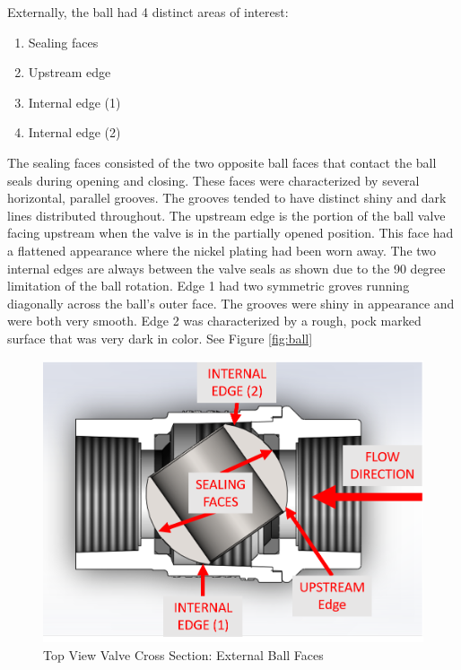\documentclass[]{article}
\begin{document}
Externally, the ball had 4 distinct areas of interest:
\begin{enumerate}
	\item Sealing faces
	\item Upstream edge
	\item Internal edge (1)
	\item Internal edge (2)
	\end{enumerate} 
The sealing faces consisted of the two opposite ball faces that contact the ball seals during opening and closing. These faces were characterized by several horizontal, parallel grooves. The grooves tended to have distinct shiny and dark lines distributed throughout. The upstream edge is the portion of the ball valve facing upstream when the valve is in the partially opened position. This face had a flattened appearance where the nickel plating had been worn away. The two internal edges are always between the valve seals as shown due to the 90 degree limitation of the ball rotation. Edge 1 had two symmetric groves running diagonally across the ball's outer face. The grooves were shiny in appearance and were both very smooth. Edge 2 was characterized by a rough, pock marked surface that was very dark in color. See Figure \ref{fig:ball} 

\begin{figure}[h]
	\centering
	\includegraphics[width=0.7\linewidth]{Photos/Ball_Face_Callouts}
	\caption{Top View Valve Cross Section: External Ball Faces}
	\label{fig:ballfacecallouts}
\end{figure}
\end{document}
